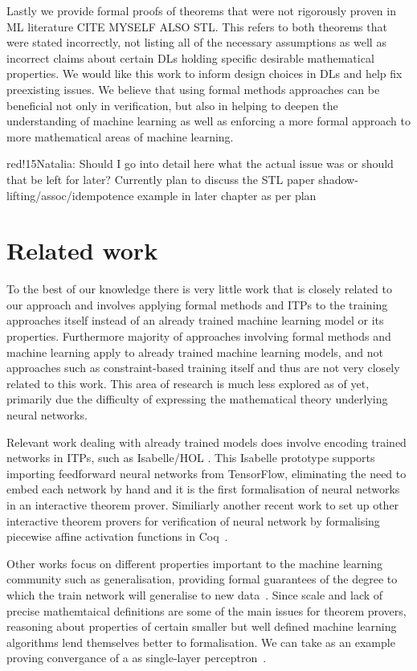 \documentclass[a4paper,UKenglish,cleveref, autoref, thm-restate]{lipics-v2021}
\newcommand{\natalia}[1]{\begin{authorComment}{red!15}Natalia: #1\end{authorComment}}
\begin{document}
Lastly we provide formal proofs of theorems that were not rigorously proven in ML literature CITE MYSELF ALSO STL. This refers to both theorems that were stated incorrectly, not listing all of the necessary assumptions as well as incorrect claims about certain DLs holding specific desirable mathematical properties. 
We would like this work to inform design choices in DLs and help fix preexisting issues. We believe that using formal methods approaches can be beneficial not only in verification, but also in helping to deepen the understanding of machine learning as well as enforcing a more formal approach to more mathematical areas of machine learning. \natalia{Should I go into detail here what the actual issue was or should that be left for later? Currently plan to discuss the STL paper shadow-lifting/assoc/idempotence example in later chapter as per plan}


\section{Related work}

To the best of our knowledge there is very little work that is closely related to our approach and involves applying formal methods and ITPs to the training approaches itself instead of an already trained machine learning model or its properties. Furthermore majority of approaches involving formal methods and machine learning  apply to already trained machine learning models, and not approaches such as constraint-based training itself and thus are not very closely related to this work. This area of research is much less explored as of yet, primarily due the difficulty of expressing the mathematical theory underlying neural networks. 

Relevant work dealing with already trained models does involve encoding trained networks in ITPs, such as Isabelle/HOL \cite{brucker2023verifying}. This Isabelle prototype supports importing feedforward neural networks from TensorFlow, eliminating the need to embed each network by hand and it is the first formalisation of neural networks in an interactive theorem prover. Similiarly another recent work to set up other interactive theorem provers for verification of neural network by formalising piecewise affine activation functions in Coq~\cite{aleksandrov2023formalizing}. 

Other works focus on different properties important to the machine learning community such as generalisation, providing formal guarantees of the degree to which the train network will generalise to new data~\cite{bagnall2019certifying}. Since scale and lack of precise mathemtaical definitions are some of the main issues for theorem provers, reasoning about properties of certain smaller but well defined machine learning algorithms lend themselves better to formalisation. We can take as an example proving convergance of a as single-layer perceptron~\cite{murphy2017verified}.
\end{document}
